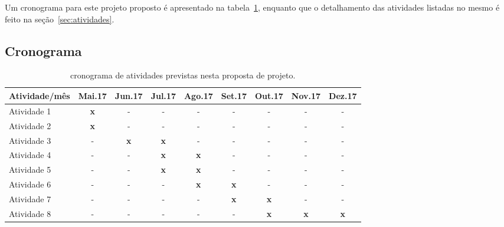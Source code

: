 \documentclass[12pt]{article}
\begin{document}
Um cronograma para este projeto proposto é apresentado na 
tabela~\ref{tab:cronograma}, enquanto que o detalhamento das atividades
listadas no mesmo é feito na seção~\ref{sec:atividades}.

\subsection{Cronograma}
\begin{table}[!ht]
\caption{cronograma de atividades previstas nesta proposta de projeto.} 
\label{tab:cronograma}
\begin{center}
\smallskip
\begin{tabular}{l cccccccc}
    \toprule
    \small Atividade/mês & \small Mai.17 & \small Jun.17 & \small Jul.17
                         & \small Ago.17 & \small Set.17 & \small Out.17
                         & \small Nov.17 & \small Dez.17
    \\ \hline

    \small Atividade 1   
    & \small {\bf x} & \small - & \small - & \small - & \small -
    & \small - & \small - & \small - \\
    

    \small Atividade 2   
    & \small {\bf x} & \small - & \small - & \small - & \small -
    & \small - & \small - & \small - \\

    \small Atividade 3   
    & \small - & \small {\bf x} & \small {\bf x} & \small - & \small -
    & \small - & \small - & \small - \\

    \small Atividade 4
    & \small - & \small - & \small {\bf x} & \small {\bf x} & \small -
    & \small - & \small - & \small - \\

    \small Atividade 5   
    & \small - & \small - & \small {\bf x} & \small {\bf x} & \small -
    & \small - & \small - & \small - \\

    \small Atividade 6   
    & \small - & \small - & \small - & \small {\bf x} & \small {\bf x}
    & \small - & \small - & \small - \\

    \small Atividade 7
    & \small - & \small - & \small - & \small - & {\bf x}
    & \small {\bf x} & \small - & \small - \\

    \small Atividade 8  
    & \small - & \small - & \small - & \small - & -
    & \small {\bf x} & \small {\bf x} & \small {\bf x} \\


\end{tabular}
\end{center}
\end{table}
\end{document}
